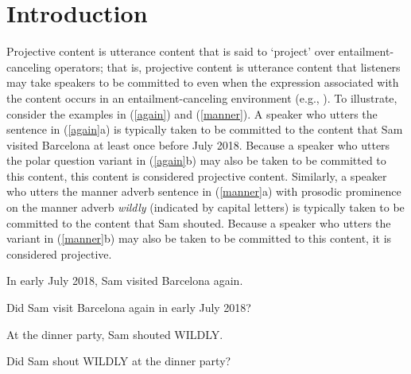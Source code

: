 \documentclass[a4paper,12pt]{article}
\newcommand{\6}{\mbox{$[\hspace*{-.6mm}[$}}
\newcommand{\9}{\mbox{$]\hspace*{-.6mm}]$}}
\begin{document}
\section{Introduction}\label{s1}

Projective content is utterance content that is said to `project' over entailment-canceling operators; that is, projective content is utterance content that listeners may take speakers to be committed to even when the expression associated with the content occurs in an entailment-canceling environment (e.g., \citealt*{ccmg90,potts05,brst-ar}). To illustrate, consider the examples in (\ref{again}) and (\ref{manner}). A speaker who utters the sentence in (\ref{again}a) is typically taken to be committed to the content that Sam visited Barcelona at least once before July 2018. Because a speaker who utters the polar question variant in (\ref{again}b) may also be taken to be committed to this content, this content is considered projective content. Similarly, a speaker who utters the manner adverb sentence in (\ref{manner}a) with prosodic prominence on the manner adverb {\em wildly} (indicated by capital letters) is typically taken to be committed to the content that Sam shouted. Because a speaker who utters the variant in (\ref{manner}b) may also be taken to be committed to this content, it is considered projective.

\begin{exe}
\ex\label{again}
\begin{xlist}
\ex In early July 2018, Sam visited Barcelona again.

\ex Did Sam visit Barcelona again in early July 2018? 
\end{xlist}

\ex\label{manner}

\begin{xlist}
\ex At the dinner party, Sam shouted WILDLY.

\ex Did Sam shout WILDLY at the dinner party?
\end{xlist}
\end{exe}
\end{document}
